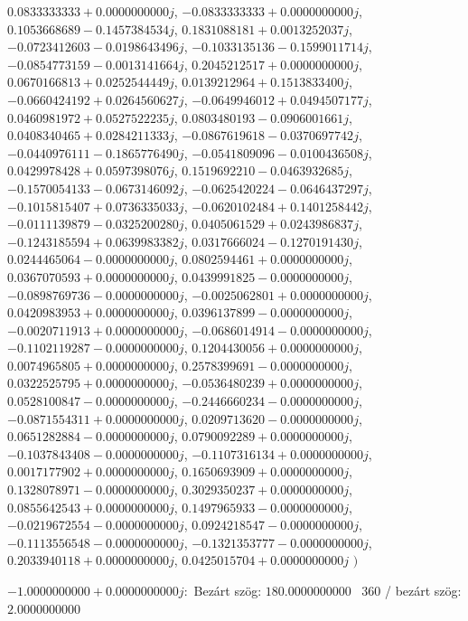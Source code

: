 \documentclass[14pt,a4paper]{article}
\begin{document}
\begin{itemize}
$0.0833333333+0.0000000000j$, $-0.0833333333+0.0000000000j$, $0.1053668689-0.1457384534j$, $0.1831088181+0.0013252037j$, $-0.0723412603-0.0198643496j$, $-0.1033135136-0.1599011714j$, $-0.0854773159-0.0013141664j$, $0.2045212517+0.0000000000j$, $0.0670166813+0.0252544449j$, $0.0139212964+0.1513833400j$, $-0.0660424192+0.0264560627j$, $-0.0649946012+0.0494507177j$, $0.0460981972+0.0527522235j$, $0.0803480193-0.0906001661j$, $0.0408340465+0.0284211333j$, $-0.0867619618-0.0370697742j$, $-0.0440976111-0.1865776490j$, $-0.0541809096-0.0100436508j$, $0.0429978428+0.0597398076j$, $0.1519692210-0.0463932685j$, $-0.1570054133-0.0673146092j$, $-0.0625420224-0.0646437297j$, $-0.1015815407+0.0736335033j$, $-0.0620102484+0.1401258442j$, $-0.0111139879-0.0325200280j$, $0.0405061529+0.0243986837j$, $-0.1243185594+0.0639983382j$, $0.0317666024-0.1270191430j$, $0.0244465064-0.0000000000j$, $0.0802594461+0.0000000000j$, $0.0367070593+0.0000000000j$, $0.0439991825-0.0000000000j$, $-0.0898769736-0.0000000000j$, $-0.0025062801+0.0000000000j$, $0.0420983953+0.0000000000j$, $0.0396137899-0.0000000000j$, $-0.0020711913+0.0000000000j$, $-0.0686014914-0.0000000000j$, $-0.1102119287-0.0000000000j$, $0.1204430056+0.0000000000j$, $0.0074965805+0.0000000000j$, $0.2578399691-0.0000000000j$, $0.0322525795+0.0000000000j$, $-0.0536480239+0.0000000000j$, $0.0528100847-0.0000000000j$, $-0.2446660234-0.0000000000j$, $-0.0871554311+0.0000000000j$, $0.0209713620-0.0000000000j$, $0.0651282884-0.0000000000j$, $0.0790092289+0.0000000000j$, $-0.1037843408-0.0000000000j$, $-0.1107316134+0.0000000000j$, $0.0017177902+0.0000000000j$, $0.1650693909+0.0000000000j$, $0.1328078971-0.0000000000j$, $0.3029350237+0.0000000000j$, $0.0855642543+0.0000000000j$, $0.1497965933-0.0000000000j$, $-0.0219672554-0.0000000000j$, $0.0924218547-0.0000000000j$, $-0.1113556548-0.0000000000j$, $-0.1321353777-0.0000000000j$, $0.2033940118+0.0000000000j$, $0.0425015704+0.0000000000j$
$\big)$
\end{itemize}
$-1.0000000000+0.0000000000j$:\
Bezárt szög: $180.0000000000$ \
360 / bezárt szög: $2.0000000000$\
\end{document}
